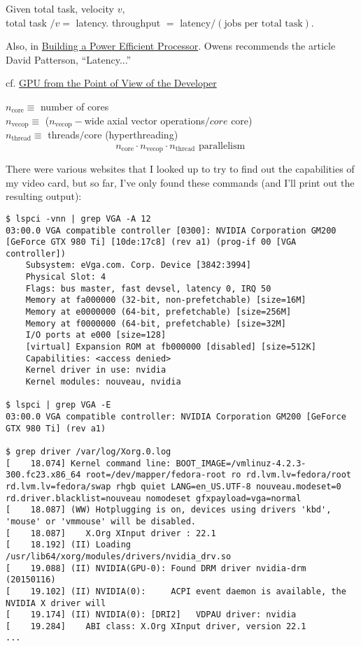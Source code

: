 \documentclass[10pt]{amsart}
\begin{document}
\begin{multicols*}{2}
Given total task, velocity $v$, \\
total task $/v = $ latency.  throughput $=$ latency$/(\text{jobs per total task})$.  


Also, in \href{https://classroom.udacity.com/courses/cs344/lessons/55120467/concepts/669874580923}{Building a Power Efficient Processor}.  Owens recommends the article David Patterson, ``Latency...''

cf. \href{https://classroom.udacity.com/courses/cs344/lessons/55120467/concepts/671181630923}{GPU from the Point of View of the Developer}

$n_{\text{core}} \equiv $ number of cores \\
$n_{\text{vecop}} \equiv$ ($n_{\text{vecop}}-$wide axial vector operations$/core$ core) \\
$n_{\text{thread}} \equiv $ threads$/$core (hyperthreading)
\[
n_{\text{core}} \cdot n_{\text{vecop}} \cdot n_{\text{thread}}  \text{ parallelism  }
\]

There were various websites that I looked up to try to find out the capabilities of my video card, but so far, I've only found these commands (and I'll print out the resulting output):
{\scriptsize
\begin{lstlisting}
$ lspci -vnn | grep VGA -A 12
03:00.0 VGA compatible controller [0300]: NVIDIA Corporation GM200 [GeForce GTX 980 Ti] [10de:17c8] (rev a1) (prog-if 00 [VGA controller])
	Subsystem: eVga.com. Corp. Device [3842:3994]
	Physical Slot: 4
	Flags: bus master, fast devsel, latency 0, IRQ 50
	Memory at fa000000 (32-bit, non-prefetchable) [size=16M]
	Memory at e0000000 (64-bit, prefetchable) [size=256M]
	Memory at f0000000 (64-bit, prefetchable) [size=32M]
	I/O ports at e000 [size=128]
	[virtual] Expansion ROM at fb000000 [disabled] [size=512K]
	Capabilities: <access denied>
	Kernel driver in use: nvidia
	Kernel modules: nouveau, nvidia

$ lspci | grep VGA -E
03:00.0 VGA compatible controller: NVIDIA Corporation GM200 [GeForce GTX 980 Ti] (rev a1)

$ grep driver /var/log/Xorg.0.log
[    18.074] Kernel command line: BOOT_IMAGE=/vmlinuz-4.2.3-300.fc23.x86_64 root=/dev/mapper/fedora-root ro rd.lvm.lv=fedora/root rd.lvm.lv=fedora/swap rhgb quiet LANG=en_US.UTF-8 nouveau.modeset=0 rd.driver.blacklist=nouveau nomodeset gfxpayload=vga=normal
[    18.087] (WW) Hotplugging is on, devices using drivers 'kbd', 'mouse' or 'vmmouse' will be disabled.
[    18.087] 	X.Org XInput driver : 22.1
[    18.192] (II) Loading /usr/lib64/xorg/modules/drivers/nvidia_drv.so
[    19.088] (II) NVIDIA(GPU-0): Found DRM driver nvidia-drm (20150116)
[    19.102] (II) NVIDIA(0):     ACPI event daemon is available, the NVIDIA X driver will
[    19.174] (II) NVIDIA(0): [DRI2]   VDPAU driver: nvidia
[    19.284] 	ABI class: X.Org XInput driver, version 22.1
...


\end{lstlisting}}
\end{multicols*}
\end{document}
